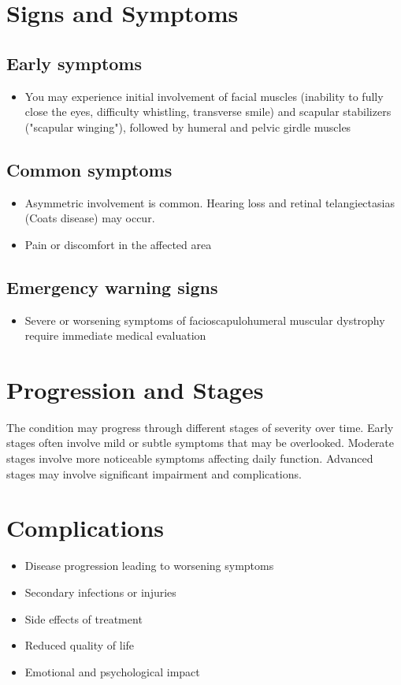 \section{Signs and Symptoms}

\subsection{Early symptoms}
\begin{itemize}[noitemsep]
  \item You may experience initial involvement of facial muscles (inability to fully close the eyes, difficulty whistling, transverse smile) and scapular stabilizers ("scapular winging"), followed by humeral and pelvic girdle muscles
\end{itemize}

\subsection{Common symptoms}
\begin{itemize}[noitemsep]
  \item Asymmetric involvement is common. Hearing loss and retinal telangiectasias (Coats disease) may occur.
  \item Pain or discomfort in the affected area
  \end{itemize}

\subsection{Emergency warning signs}
\begin{itemize}[noitemsep]
  \item Severe or worsening symptoms of facioscapulohumeral muscular dystrophy require immediate medical evaluation
\end{itemize}
\section{Progression and Stages}
The condition may progress through different stages of severity over time. Early stages often involve mild or subtle symptoms that may be overlooked. Moderate stages involve more noticeable symptoms affecting daily function. Advanced stages may involve significant impairment and complications.
\section{Complications}
\begin{itemize}[noitemsep]
  \item Disease progression leading to worsening symptoms
  \item Secondary infections or injuries
  \item Side effects of treatment
  \item Reduced quality of life
  \item Emotional and psychological impact
\end{itemize}
